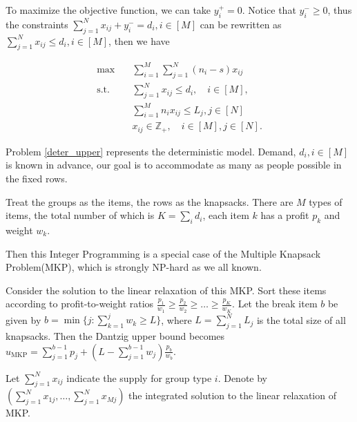 To maximize the objective function, we can take $y_i^{+} = 0$. Notice that $y_{i}^{-} \geq 0$, thus the constraints $\sum_{j= 1}^{N} x_{ij} + y_{i}^{-} = d_{i}, i \in [M]$ can be rewritten as $\sum_{j= 1}^{N} x_{ij} \leq d_{i}, i \in [M]$, then we have

\begin{equation}\label{deter_upper}
  \begin{aligned}
  \max \quad & \sum_{i=1}^{M}  \sum_{j= 1}^{N} (n_i- s) x_{ij} \\
  \text {s.t.} \quad & \sum_{j= 1}^{N} x_{ij} \leq d_{i}, \quad i \in [M], \\
  & \sum_{i=1}^{M} n_{i} x_{ij} \leq L_j, j \in [N] \\
  & x_{ij} \in \mathbb{Z}_{+}, \quad i \in [M], j \in [N].
  \end{aligned}
\end{equation}

Problem \eqref{deter_upper} represents the deterministic model. Demand, $d_i, i \in [M]$ is known in advance, our goal is to accommodate as many as people possible in the fixed rows.

Treat the groups as the items, the rows as the knapsacks. There are $M$ types of items, the total number of which is $K = \sum_{i} d_i$, each item $k$ has a profit $p_k$ and weight $w_k$. 


Then this Integer Programming is a special case of the Multiple Knapsack Problem(MKP), which is strongly NP-hard as we all known.


Consider the solution to the linear relaxation of this MKP. Sort these items according to profit-to-weight ratios $\frac{p_1}{w_1} \geq \frac{p_2}{w_2} \geq \ldots \geq \frac{p_K}{w_K}$.
Let the break item $b$ be given by $b=\min \{j: \sum_{k=1}^j w_k \geq L\}$, where $L = \sum_{j=1}^{N} L_j$ is the total size of all knapsacks. Then the Dantzig upper bound \cite{dantzig1957discrete} becomes 
$u_{\mathrm{MKP}}=\sum_{j=1}^{b-1} p_j+\left(L-\sum_{j=1}^{b-1} w_j\right) \frac{p_b}{w_b}$. 

Let $\sum_{j=1}^{N} x_{ij}$ indicate the supply for group type $i$. Denote by $(\sum_{j=1}^{N} x_{1j},\ldots, \sum_{j=1}^{N} x_{Mj})$ the integrated solution to the linear relaxation of MKP.

